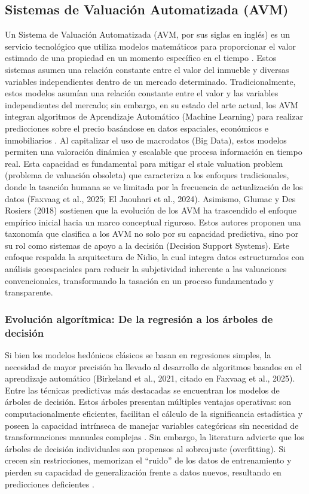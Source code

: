 \subsection{Sistemas de Valuación Automatizada (AVM)}

Un Sistema de Valuación Automatizada (AVM, por sus siglas en inglés) es un servicio tecnológico que utiliza modelos matemáticos para proporcionar el valor estimado de una propiedad en un momento específico en el tiempo \parencite{ElJaouhariEtAl2024}. Estos sistemas asumen una relación constante entre el valor del inmueble y diversas variables independientes dentro de un mercado determinado. Tradicionalmente, estos modelos asumían una relación constante entre el valor y las variables independientes del mercado; sin embargo, en su estado del arte actual, los AVM integran algoritmos de Aprendizaje Automático (Machine Learning) para realizar predicciones sobre el precio basándose en datos espaciales, económicos e inmobiliarios \parencite{FaxvaagEtAl2025}. Al capitalizar el uso de macrodatos (Big Data), estos modelos permiten una valoración dinámica y escalable que procesa información en tiempo real. Esta capacidad es fundamental para mitigar el stale valuation problem (problema de valuación obsoleta) que caracteriza a los enfoques tradicionales, donde la tasación humana se ve limitada por la frecuencia de actualización de los datos (Faxvaag et al., 2025; El Jaouhari et al., 2024). Asimismo, Glumac y Des Rosiers (2018) sostienen que la evolución de los AVM ha trascendido el enfoque empírico inicial hacia un marco conceptual riguroso. Estos autores proponen una taxonomía que clasifica a los AVM no solo por su capacidad predictiva, sino por su rol como sistemas de apoyo a la decisión (Decision Support Systems). Este enfoque respalda la arquitectura de Nidio, la cual integra datos estructurados con análisis geoespaciales para reducir la subjetividad inherente a las valuaciones convencionales, transformando la tasación en un proceso fundamentado y transparente.

\subsubsection{Evolución algorítmica: De la regresión a los árboles de decisión}

Si bien los modelos hedónicos clásicos se basan en regresiones simples, la necesidad de mayor precisión ha llevado al desarrollo de algoritmos basados en el aprendizaje automático (Birkeland et al., 2021, citado en Faxvaag et al., 2025). Entre las técnicas predictivas más destacadas se encuentran los modelos de árboles de decisión. Estos árboles presentan múltiples ventajas operativas: son computacionalmente eficientes, facilitan el cálculo de la significancia estadística y poseen la capacidad intrínseca de manejar variables categóricas sin necesidad de transformaciones manuales complejas \parencite{Babtan2024}. Sin embargo, la literatura advierte que los árboles de decisión individuales son propensos al sobreajuste (overfitting). Si crecen sin restricciones, memorizan el ``ruido'' de los datos de entrenamiento y pierden su capacidad de generalización frente a datos nuevos, resultando en predicciones deficientes \parencite{BirkelandEtAl2021}.

